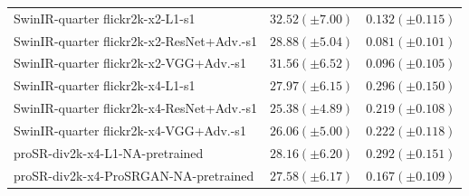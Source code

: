 \documentclass[10pt]{article} %
\begin{document}
\begin{longtable}{| p{} | p{} | p{} |}
SwinIR-quarter flickr2k-x2-L1-s1 & $32.52 (\pm 7.00)$ & $0.132 (\pm 0.115)$ \\
SwinIR-quarter flickr2k-x2-ResNet+Adv.-s1 & $28.88 (\pm 5.04)$ & $0.081 (\pm 0.101)$ \\
SwinIR-quarter flickr2k-x2-VGG+Adv.-s1 & $31.56 (\pm 6.52)$ & $0.096 (\pm 0.105)$ \\
SwinIR-quarter flickr2k-x4-L1-s1 & $27.97 (\pm 6.15)$ & $0.296 (\pm 0.150)$ \\
SwinIR-quarter flickr2k-x4-ResNet+Adv.-s1 & $25.38 (\pm 4.89)$ & $0.219 (\pm 0.108)$ \\
SwinIR-quarter flickr2k-x4-VGG+Adv.-s1 & $26.06 (\pm 5.00)$ & $0.222 (\pm 0.118)$ \\
proSR-div2k-x4-L1-NA-pretrained & $28.16 (\pm 6.20)$ & $0.292 (\pm 0.151)$ \\
proSR-div2k-x4-ProSRGAN-NA-pretrained & $27.58 (\pm 6.17)$ & $0.167 (\pm 0.109)$ \\
\hline
\end{longtable}
\end{document}
